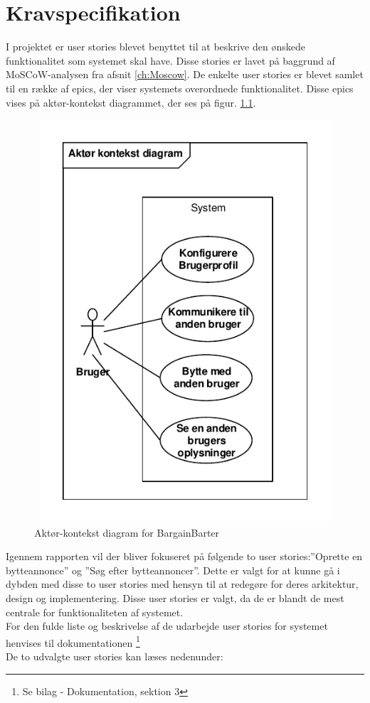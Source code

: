 \chapter{Kravspecifikation}\label{ch:Krav}

I projektet er user stories blevet benyttet til at beskrive den ønskede funktionalitet som systemet skal have. Disse stories er lavet på baggrund af MoSCoW-analysen fra afsnit \ref{ch:Moscow}.
De enkelte user stories er blevet samlet til en række af epics, der viser systemets overordnede funktionalitet. Disse epics vises på aktør-kontekst diagrammet, der ses på figur. \ref{fig:KontekstDia}. 

\begin{figure}[H]
	\includegraphics[width=140mm,height=150mm]{../Dokumentation/figures/KontekstDiagram.PDF}
	\caption{Aktør-kontekst diagram for BargainBarter}
	\label{fig:KontekstDia}
\end{figure}

\noindent Igennem rapporten vil der bliver fokuseret på følgende to user stories:''Oprette en bytteannonce'' og ''Søg efter bytteannoncer''. Dette er valgt for at kunne gå i dybden med disse to user stories med hensyn til at redegøre for deres arkitektur, design og implementering. Disse user stories er valgt, da de er blandt de mest centrale for funktionaliteten af systemet. \\ For den fulde liste og beskrivelse af de udarbejde user stories for systemet henvises til dokumentationen \footnote{Se bilag - Dokumentation, sektion 3}\\
De to udvalgte user stories kan læses nedenunder:

